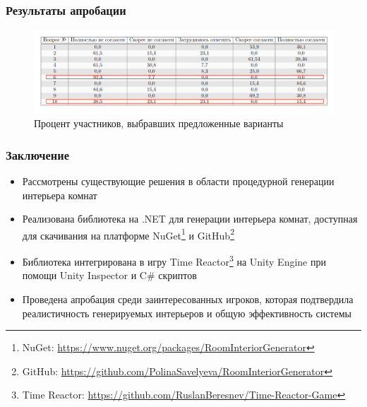 \documentclass{beamer}
\begin{document}
\begin{frame}[t]
    \frametitle{Результаты апробации}
    \vspace*{\fill}
    \begin{figure}
      \centering
        \includegraphics[width=\textwidth]{pictures/experiment.png}
        \caption{Процент участников, выбравших предложенные варианты}
    \end{figure}
    \vspace*{\fill}
\end{frame}

\begin{frame}
  \frametitle{Заключение}
    \begin{itemize}
        \item Рассмотрены существующие решения в области процедурной генерации интерьера комнат
        \item Реализована библиотека на .NET для генерации интерьера комнат, доступная для скачивания на платформе NuGet\footnote{NuGet: \url{https://www.nuget.org/packages/RoomInteriorGenerator}} и GitHub\footnote{GitHub: \url{https://github.com/PolinaSavelyeva/RoomInteriorGenerator}}
        \item Библиотека интегрирована в игру Ti\-me Re\-ac\-tor\footnote{Time Reactor: \url{https://github.com/RuslanBeresnev/Time-Reactor-Game}} на Uni\-ty En\-gi\-ne при помощи Uni\-ty Ins\-pec\-tor и C\# скриптов
        \item Проведена апробация среди заинтересованных игроков, которая подтвердила реалистичность генерируемых интерьеров и общую эффективность системы 
    \end{itemize}
\end{frame}
\end{document}
